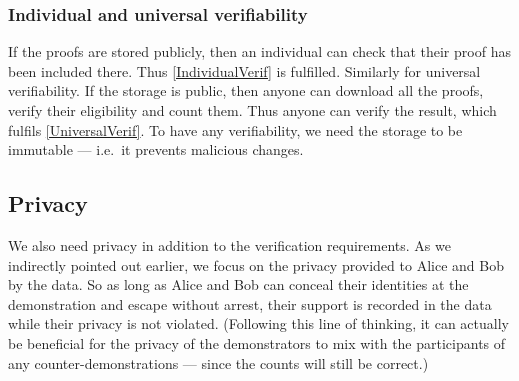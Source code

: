 \subsubsection{Individual and universal verifiability}

If the proofs are stored publicly, then an individual can check that their 
proof has been included there.
Thus \cref{IndividualVerif} is fulfilled.
Similarly for universal verifiability.
If the storage is public, then anyone can download all the proofs, verify their 
eligibility and count them.
Thus anyone can verify the result, which fulfils \cref{UniversalVerif}.
To have any verifiability, we need the storage to be immutable --- i.e.\ it 
prevents malicious changes.


\subsection{Privacy}%
\label{Privacy}

We also need privacy in addition to the verification requirements.
As we indirectly pointed out earlier, we focus on the privacy provided to Alice 
and Bob by the data.
So as long as Alice and Bob can conceal their identities at the demonstration 
and escape without arrest, their support is recorded in the data while their 
privacy is not violated.
(Following this line of thinking, it can actually be beneficial for the privacy 
of the demonstrators to mix with the participants of any counter-demonstrations 
--- since the counts will still be correct.)


